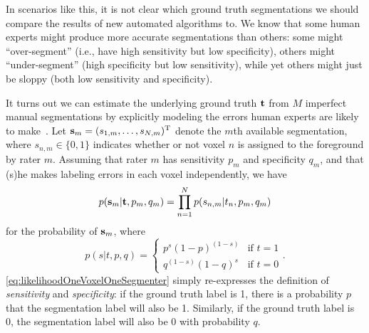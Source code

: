 \documentclass[10pt,twoside]{book}
\begin{document}
In scenarios like this, it is not clear which ground truth segmentations we should compare the results of new automated algorithms to. We know that some human experts might produce more accurate segmentations
than others: some might ``over-segment'' (i.e., have high sensitivity but low specificity), others might ``under-segment'' (high specificity but low sensitivity), while yet others might just be sloppy (both low
sensitivity and specificity).

It turns out we can estimate the underlying ground truth $\mathbf{t}$ from $M$ imperfect manual segmentations by explicitly modeling the errors human experts are likely to make~\cite{WarfieldTMI2004}.
Let 
$\mathbf{s}_m = ( s_{1,m}, \ldots, s_{N,m} )^\mathrm{T}$ denote the $m$th available segmentation, where $s_{n,m} \in \{0, 1\}$ indicates whether or not voxel $n$ is assigned to the 
foreground
by rater $m$.
Assuming that rater $m$ has sensitivity $p_m$ and specificity $q_m$,
and that (s)he makes labeling errors in each voxel independently, we have
\begin{equation}
  p( \mathbf{s}_m | \mathbf{t}, p_m, q_m ) = \prod_{n=1}^N p( s_{n,m} | t_n, p_m, q_m )  
\end{equation}
for the probability of $\mathbf{s}_m$,
where
\begin{equation}
  p( s | t, p, q ) = 
  \left\{ \begin{array}{ll}
    p^s (1-p)^{(1-s)}  & \textrm{if $t = 1$}\\
    q^{(1-s)} (1-q)^s & \textrm{if $t=0$}
  \end{array} \right.
  .
  \label{eq:likelihoodOneVoxelOneSegmenter}
\end{equation}
\eqref{eq:likelihoodOneVoxelOneSegmenter} simply re-expresses the definition of \emph{sensitivity} and \emph{specificity}: if the ground truth label is 1, there is a probability $p$ that the segmentation
label will also be 1. Similarly, if the ground truth label is 0, the segmentation label will also be 0 with probability $q$.
\end{document}
